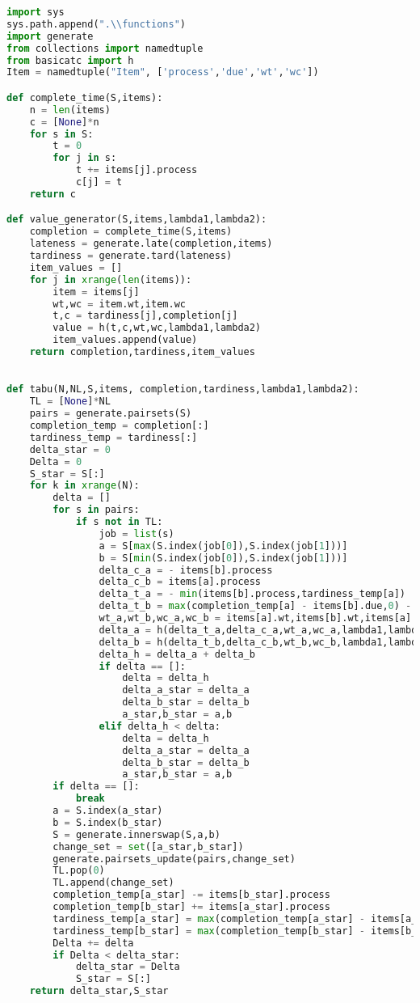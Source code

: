 \begin{lstlisting}[language = Python]
import sys
sys.path.append(".\\functions")
import generate
from collections import namedtuple
from basicatc import h
Item = namedtuple("Item", ['process','due','wt','wc'])

def complete_time(S,items):
	n = len(items)
	c = [None]*n
	for s in S:
		t = 0
		for j in s:
			t += items[j].process
			c[j] = t
	return c

def value_generator(S,items,lambda1,lambda2):
	completion = complete_time(S,items)
	lateness = generate.late(completion,items)
	tardiness = generate.tard(lateness)
	item_values = []
	for j in xrange(len(items)):
		item = items[j]
		wt,wc = item.wt,item.wc
		t,c = tardiness[j],completion[j]
		value = h(t,c,wt,wc,lambda1,lambda2)
		item_values.append(value)
	return completion,tardiness,item_values
	

def tabu(N,NL,S,items, completion,tardiness,lambda1,lambda2):
	TL = [None]*NL
	pairs = generate.pairsets(S)
	completion_temp = completion[:]
	tardiness_temp = tardiness[:]
	delta_star = 0
	Delta = 0
	S_star = S[:]
	for k in xrange(N):
		delta = []
		for s in pairs:
			if s not in TL:
				job = list(s)
				a = S[max(S.index(job[0]),S.index(job[1]))]
				b = S[min(S.index(job[0]),S.index(job[1]))]
				delta_c_a = - items[b].process
				delta_c_b = items[a].process
				delta_t_a = - min(items[b].process,tardiness_temp[a])
				delta_t_b = max(completion_temp[a] - items[b].due,0) - tardiness_temp[b]
				wt_a,wt_b,wc_a,wc_b = items[a].wt,items[b].wt,items[a].wc,items[b].wc
				delta_a = h(delta_t_a,delta_c_a,wt_a,wc_a,lambda1,lambda2)
				delta_b = h(delta_t_b,delta_c_b,wt_b,wc_b,lambda1,lambda2)
				delta_h = delta_a + delta_b
				if delta == []:
					delta = delta_h
					delta_a_star = delta_a
					delta_b_star = delta_b 
					a_star,b_star = a,b
				elif delta_h < delta:
					delta = delta_h
					delta_a_star = delta_a
					delta_b_star = delta_b 
					a_star,b_star = a,b
		if delta == []:
			break
		a = S.index(a_star)
		b = S.index(b_star)
		S = generate.innerswap(S,a,b)
		change_set = set([a_star,b_star])
		generate.pairsets_update(pairs,change_set)
		TL.pop(0)
		TL.append(change_set)
		completion_temp[a_star] -= items[b_star].process
		completion_temp[b_star] += items[a_star].process
		tardiness_temp[a_star] = max(completion_temp[a_star] - items[a_star].due,0)
		tardiness_temp[b_star] = max(completion_temp[b_star] - items[b_star].due,0)
		Delta += delta
		if Delta < delta_star:
			delta_star = Delta
			S_star = S[:]
	return delta_star,S_star


\end{lstlisting}
